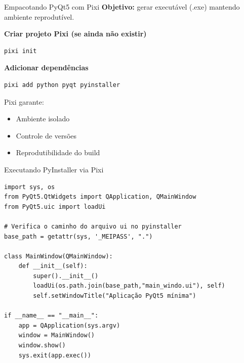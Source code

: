 \documentclass{beamer}
\begin{document}
\begin{frame}[fragile]{Empacotando PyQt5 com Pixi}
    \textbf{Objetivo:} gerar executável (.exe) mantendo ambiente reprodutível.
    
    \vspace{0.4cm}
    
    \textbf{Criar projeto Pixi (se ainda não existir)}
    \begin{verbatim}
pixi init
    \end{verbatim}
    
    \vspace{0.4cm}
    \textbf{Adicionar dependências}
    
    \begin{verbatim}
pixi add python pyqt pyinstaller
    \end{verbatim}
    
    \vspace{0.4cm}
    
    Pixi garante:
    \begin{itemize}
        \item Ambiente isolado
        \item Controle de versões
        \item Reprodutibilidade do build
    \end{itemize}
\end{frame}

\begin{frame}[fragile]{Executando PyInstaller via Pixi}
    \begin{verbatim}
import sys, os
from PyQt5.QtWidgets import QApplication, QMainWindow
from PyQt5.uic import loadUi

# Verifica o caminho do arquivo ui no pyinstaller
base_path = getattr(sys, '_MEIPASS', ".")

class MainWindow(QMainWindow):
    def __init__(self):
        super().__init__()
        loadUi(os.path.join(base_path,"main_windo.ui"), self)
        self.setWindowTitle("Aplicação PyQt5 mínima")

if __name__ == "__main__":
    app = QApplication(sys.argv)
    window = MainWindow()
    window.show()
    sys.exit(app.exec())
    \end{verbatim}
\end{frame}
\end{document}
